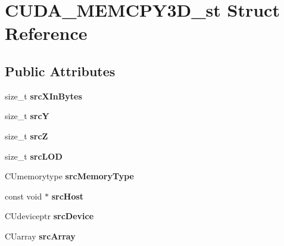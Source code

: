 \hypertarget{structCUDA__MEMCPY3D__st}{}\section{C\+U\+D\+A\+\_\+\+M\+E\+M\+C\+P\+Y3\+D\+\_\+st Struct Reference}
\label{structCUDA__MEMCPY3D__st}
\subsection*{Public Attributes}
\begin{DoxyCompactItemize}
\item 
size\+\_\+t {\bfseries src\+X\+In\+Bytes}\hypertarget{structCUDA__MEMCPY3D__st_a3920b63ad9b65c82e307af0b48dc5a97}{}\label{structCUDA__MEMCPY3D__st_a3920b63ad9b65c82e307af0b48dc5a97}

\item 
size\+\_\+t {\bfseries srcY}\hypertarget{structCUDA__MEMCPY3D__st_a4e6306c59b4a34c36d91530e9e5d4248}{}\label{structCUDA__MEMCPY3D__st_a4e6306c59b4a34c36d91530e9e5d4248}

\item 
size\+\_\+t {\bfseries srcZ}\hypertarget{structCUDA__MEMCPY3D__st_a2ec7d2db4a3c679771f8e75d9f5deb52}{}\label{structCUDA__MEMCPY3D__st_a2ec7d2db4a3c679771f8e75d9f5deb52}

\item 
size\+\_\+t {\bfseries src\+L\+OD}\hypertarget{structCUDA__MEMCPY3D__st_a5cc0830e8f653ba4121fa009f9abf445}{}\label{structCUDA__MEMCPY3D__st_a5cc0830e8f653ba4121fa009f9abf445}

\item 
C\+Umemorytype {\bfseries src\+Memory\+Type}\hypertarget{structCUDA__MEMCPY3D__st_a693af7438a3b485221e1f20cee82cd84}{}\label{structCUDA__MEMCPY3D__st_a693af7438a3b485221e1f20cee82cd84}

\item 
const void $\ast$ {\bfseries src\+Host}\hypertarget{structCUDA__MEMCPY3D__st_a7f02d9c78f476996e75a9f53f6b21d13}{}\label{structCUDA__MEMCPY3D__st_a7f02d9c78f476996e75a9f53f6b21d13}

\item 
C\+Udeviceptr {\bfseries src\+Device}\hypertarget{structCUDA__MEMCPY3D__st_a53d3d8cb6341e8f58fe89aa7ab54c795}{}\label{structCUDA__MEMCPY3D__st_a53d3d8cb6341e8f58fe89aa7ab54c795}

\item 
C\+Uarray {\bfseries src\+Array}\hypertarget{structCUDA__MEMCPY3D__st_a6d4c1dc48609ed769f4d5463f4cfd6da}{}\label{structCUDA__MEMCPY3D__st_a6d4c1dc48609ed769f4d5463f4cfd6da}


\end{DoxyCompactItemize}
